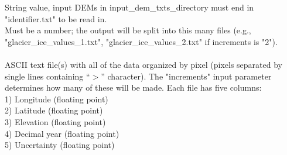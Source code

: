 \documentclass[12pt]{article}
\begin{document}
 String value, input DEMs in input\_dem\_txts\_directory must end in "identifier.txt" to be read in. \\

 Must be a number; the output will be split into this many files (e.g., "glacier\_ice\_values\_1.txt", "glacier\_ice\_values\_2.txt" if increments is "2"). \\

 \\

\noindent ASCII text file(s) with all of the data organized by pixel (pixels separated by single lines containing ``$>$'' character).
The "increments" input parameter determines how many of these will be made.
Each file has five columns: \\
1) Longitude (floating point) \\
2) Latitude (floating point) \\
3) Elevation (floating point) \\
4) Decimal year (floating point) \\
5) Uncertainty (floating point) \\
\end{document}
